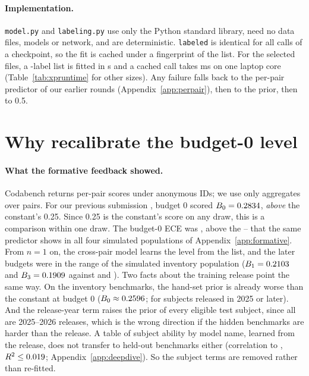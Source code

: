 \documentclass{article}
\begin{document}
\paragraph{Implementation.} \texttt{model.py} and \texttt{labeling.py} use only the Python standard library, need no data files, models or network, and are deterministic. \texttt{labeled} is identical for all calls of a checkpoint, so the fit is cached under a fingerprint of the list. For the selected files, a \CkSelBigEntries-label list is fitted in \CkSelBigFit{} s and a cached call takes \CkSelBigMs{} ms on one laptop core (Table~\ref{tab:xpruntime} for other sizes). Any failure falls back to the per-pair predictor of our earlier rounds (Appendix~\ref{app:perpair}), then to the prior, then to 0.5.

\section{Why recalibrate the budget-0 level}
\label{sec:why}

\paragraph{What the formative feedback showed.} Codabench returns per-pair scores under anonymous IDs; we use only aggregates over pairs. For our previous submission \FmShipId, budget 0 scored $B_0=0.2834$, \emph{above} the constant's 0.25. Since 0.25 is the constant's score on any draw, this is a comparison within one draw. The budget-0 ECE was \FmShipEceBZero, above the \DdEceBZeroShipMin--\DdEceBZeroShipMax{} that the same predictor shows in all four simulated populations of Appendix~\ref{app:formative}. From $n=1$ on, the cross-pair model learns the level from the list, and the later budgets were in the range of the simulated inventory population ($B_1=0.2103$ and $B_3=0.1909$ against \DdInvShipBOne{} and \DdInvShipBThree). Two facts about the training release point the same way. On the \DdPopNInvBench{} inventory benchmarks, the hand-set prior is already worse than the constant at budget 0 ($B_0\approx0.2596$; \DdPopInvYBZero{} for subjects released in 2025 or later). And the release-year term raises the prior of every eligible test subject, since all are 2025--2026 releases, which is the wrong direction if the hidden benchmarks are harder than the release. A table of subject ability by model name, learned from the release, does not transfer to held-out benchmarks either (correlation \DdAbilityCorrMin{} to \DdAbilityCorrMax, $R^2\le0.019$; Appendix~\ref{app:deepdive}). So the subject terms are removed rather than re-fitted.
\end{document}
